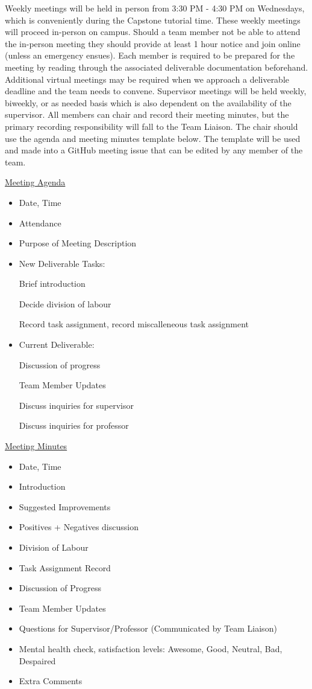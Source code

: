 \documentclass{article}
\begin{document}
Weekly meetings will be held in person from 3:30 PM - 4:30 PM on Wednesdays, which 
is conveniently during the Capstone tutorial time. These weekly meetings will 
proceed in-person on campus. Should a 
team member not be able to attend the in-person meeting they should provide at least 
1 hour notice and join online (unless an emergency ensues). Each member is required 
to be prepared for the meeting by reading through the associated deliverable 
documentation beforehand. Additional virtual meetings may be required when we approach 
a deliverable deadline and the team needs to convene. Supervisor meetings will be 
held weekly, biweekly, or as needed basis which is also dependent on the availability 
of the supervisor. All members can chair and record their meeting minutes, but the 
primary recording responsibility will fall to the Team Liaison. The chair should use 
the agenda and meeting minutes template below. The template will be used and made into 
a GitHub meeting issue that can be edited by any member of the team.

\underline{Meeting Agenda}

\begin{itemize}
  \item Date, Time
  \item Attendance
  \item Purpose of Meeting Description
  \item New Deliverable Tasks: \par
  Brief introduction \par
  Decide division of labour \par
  Record task assignment, record miscalleneous task assignment \par
  \item Current Deliverable: \par
  Discussion of progress \par
  Team Member Updates \par
  Discuss inquiries for supervisor \par
  Discuss inquiries for professor \par
\end{itemize}

\underline{Meeting Minutes}

\begin{itemize}
  \item Date, Time
  \item Introduction
  \item Suggested Improvements
  \item Positives + Negatives discussion
  \item Division of Labour
  \item Task Assignment Record
  \item Discussion of Progress
  \item Team Member Updates
  \item Questions for Supervisor/Professor (Communicated by Team Liaison)
  \item Mental health check, satisfaction levels: Awesome, Good, Neutral, Bad, Despaired
  \item Extra Comments
\end{itemize}
\end{document}
